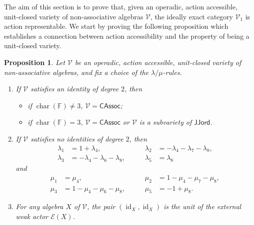 \documentclass[reqno,a4paper]{amsart}
\theoremstyle{plain}
\newtheorem{proposition}[subsection]{Proposition}
\theoremstyle{definition}
\theoremstyle{remark}
\numberwithin{equation}{section}
\newcommand{\F}{\mathbb{F}}
\newcommand{\E}{\mathcal{E}}
\newcommand{\V}{\mathcal{V}}
\DeclareMathOperator{\bchar}{char}
\DeclareMathOperator{\id}{id}
\newcommand{\CAssoc}{\ensuremath{\mathsf{CAssoc}}}
\newcommand{\JJord}{\ensuremath{\mathsf{JJord}}}
\begin{document}
The aim of this section is to prove that, given an operadic, action accessible, unit-closed variety of non-associative algebras $\V$, the ideally exact category $\V_1$ is action representable. We start by proving the following proposition which establishes a connection between action accessibility and the property of being a unit-closed variety.

\begin{proposition}\label{lemma_unit}
Let $\V$ be an operadic, action accessible, unit-closed variety of non-associative algebras, and fix a choice of the $\lambda/\mu$-rules.
\begin{enumerate}
\item If $\V$ satisfies an identity of degree $2$, then 
\begin{itemize}
\item if $\bchar(\F)\neq 3$, $\V=\CAssoc$;
\item if $\bchar(\F)= 3$, $\V=\CAssoc$ or $\V$ is a subvariety of $\JJord$.
\end{itemize}
\item If $\V$ satisfies no identities of degree $2$, then 
\begin{equation}\label{eq_lemma1}
\begin{alignedat}{2}
\lambda_1 &= 1 + \lambda_4, \qquad & \lambda_2 &= -\lambda_4 - \lambda_7 - \lambda_8, \\
\lambda_3 &= -\lambda_4 - \lambda_6 - \lambda_8, \qquad & \lambda_5 &= \lambda_8
\end{alignedat}
\end{equation}
and
\begin{equation}\label{eq_lemma2}
\begin{alignedat}{2}
\mu_1 &= \mu_4, \qquad & \mu_2 &= 1 - \mu_4 - \mu_7 - \mu_8, \\
\mu_3 &= 1 - \mu_4 - \mu_6 - \mu_8, \qquad & \mu_5 &= -1 + \mu_8.
\end{alignedat}
\end{equation}
\item For any algebra $X$ of $\V$, the pair $(\id_X,\id_X)$ is the unit of the external weak actor $\E(X)$.
\end{enumerate}
\end{proposition}
\end{document}
